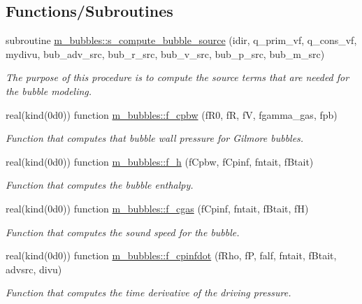 \subsection*{Functions/\+Subroutines}
\begin{DoxyCompactItemize}
\item 
subroutine \hyperlink{namespacem__bubbles_af5559af46da9282b9cc64db837958f90}{m\+\_\+bubbles\+::s\+\_\+compute\+\_\+bubble\+\_\+source} (idir, q\+\_\+prim\+\_\+vf, q\+\_\+cons\+\_\+vf, mydivu, bub\+\_\+adv\+\_\+src, bub\+\_\+r\+\_\+src, bub\+\_\+v\+\_\+src, bub\+\_\+p\+\_\+src, bub\+\_\+m\+\_\+src)
\begin{DoxyCompactList}\small\item\em The purpose of this procedure is to compute the source terms that are needed for the bubble modeling. \end{DoxyCompactList}\item 
real(kind(0d0)) function \hyperlink{namespacem__bubbles_acfe552b68c999e11b895e5cfca6a8786}{m\+\_\+bubbles\+::f\+\_\+cpbw} (f\+R0, fR, fV, fgamma\+\_\+gas, fpb)
\begin{DoxyCompactList}\small\item\em Function that computes that bubble wall pressure for Gilmore bubbles. \end{DoxyCompactList}\item 
real(kind(0d0)) function \hyperlink{namespacem__bubbles_a8f3891f06e63f4c4ee3d749f68bfabd8}{m\+\_\+bubbles\+::f\+\_\+h} (f\+Cpbw, f\+Cpinf, fntait, f\+Btait)
\begin{DoxyCompactList}\small\item\em Function that computes the bubble enthalpy. \end{DoxyCompactList}\item 
real(kind(0d0)) function \hyperlink{namespacem__bubbles_a5c730e118a27d95c21388bcc2189cc76}{m\+\_\+bubbles\+::f\+\_\+cgas} (f\+Cpinf, fntait, f\+Btait, fH)
\begin{DoxyCompactList}\small\item\em Function that computes the sound speed for the bubble. \end{DoxyCompactList}\item 
real(kind(0d0)) function \hyperlink{namespacem__bubbles_aa55a0894ed331f2e462b83b8df1d265b}{m\+\_\+bubbles\+::f\+\_\+cpinfdot} (f\+Rho, fP, falf, fntait, f\+Btait, advsrc, divu)
\begin{DoxyCompactList}\small\item\em Function that computes the time derivative of the driving pressure. \end{DoxyCompactList}\item 

\end{DoxyCompactItemize}
